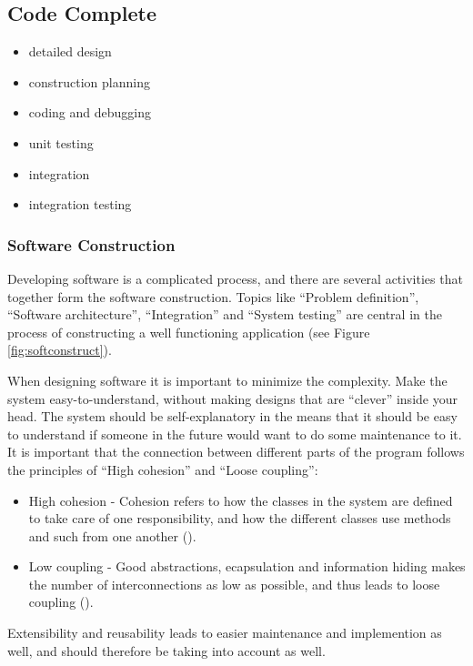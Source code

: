 \subsection{Code Complete}

\begin{itemize}
    \item detailed design
    \item construction planning
    \item coding and debugging
    \item unit testing
    \item integration
    \item integration testing
\end{itemize}

\subsubsection{Software Construction}
\label{softconstruct}
Developing software is a complicated process, and there are several activities that together form the software construction. Topics like ``Problem definition'', ``Software architecture'', ``Integration'' and ``System testing'' are central in the process of constructing a well functioning application (see Figure \ref{fig:softconstruct}).


When designing software it is important to minimize the complexity. Make the system easy-to-understand, without making designs that are ``clever'' inside your head. The system should be self-explanatory in the means that it should be easy to understand if someone in the future would want to do some maintenance to it. It is important that the connection between different parts of the program follows the principles of ``High cohesion'' and ``Loose coupling'':
\begin{itemize}
	\item High cohesion - Cohesion refers to how the classes in the system are defined to take care of one responsibility, and how the different classes use methods and such from one another (\cite{adamcarlson}).
	\item Low coupling - Good abstractions, ecapsulation and information hiding makes the number of interconnections as low as possible, and thus leads to loose coupling (\cite{adamcarlson}).
\end{itemize}
Extensibility and reusability leads to easier maintenance and implemention as well, and should therefore be taking into account as well.